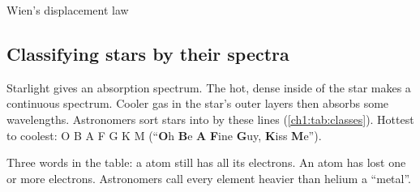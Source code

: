 \begin{formulacard}{Wien's displacement law}
  \begin{symbols}
  \end{symbols}
\end{formulacard}

\subsection{Classifying stars by their spectra}
Starlight gives an absorption spectrum. The hot, dense inside of the star makes a
continuous spectrum. Cooler gas in the star's outer layers then absorbs some
wavelengths. Astronomers sort stars into  by these lines
(\cref{ch1:tab:classes}). Hottest to coolest: O B A F G K M (``\textbf{O}h \textbf{B}e
\textbf{A} \textbf{F}ine \textbf{G}uy, \textbf{K}iss \textbf{M}e'').

Three words in the table: a  atom still has all its electrons. An
 atom has lost one or more electrons. Astronomers call every element
heavier than helium a ``metal''.

